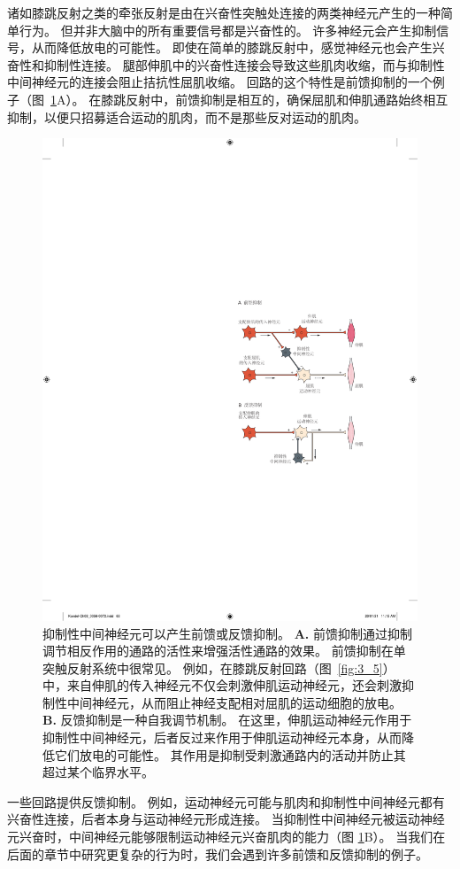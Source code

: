 诸如膝跳反射之类的牵张反射是由在兴奋性突触处连接的两类神经元产生的一种简单行为。 
但并非大脑中的所有重要信号都是兴奋性的。 
许多神经元会产生抑制信号，从而降低放电的可能性。 
即使在简单的膝跳反射中，感觉神经元也会产生兴奋性和抑制性连接。 
腿部伸肌中的兴奋性连接会导致这些肌肉收缩，而与抑制性中间神经元的连接会阻止拮抗性屈肌收缩。 
回路的这个特性是前馈抑制的一个例子（图~\ref{fig:3_7}A）。 
在膝跳反射中，前馈抑制是相互的，确保屈肌和伸肌通路始终相互抑制，以便只招募适合运动的肌肉，而不是那些反对运动的肌肉。


\begin{figure}[htbp]
	\centering
	\includegraphics[width=0.6\linewidth]{chap03/fig_3_7}
	\caption{抑制性中间神经元可以产生前馈或反馈抑制。
		\textbf{A.} 前馈抑制通过抑制调节相反作用的通路的活性来增强活性通路的效果。
		前馈抑制在单突触反射系统中很常见。 
		例如，在膝跳反射回路（图~\ref{fig:3_5}）中，来自伸肌的传入神经元不仅会刺激伸肌运动神经元，还会刺激抑制性中间神经元，从而阻止神经支配相对屈肌的运动细胞的放电。 
		\textbf{B.} 反馈抑制是一种自我调节机制。
		在这里，伸肌运动神经元作用于抑制性中间神经元，后者反过来作用于伸肌运动神经元本身，从而降低它们放电的可能性。
		其作用是抑制受刺激通路内的活动并防止其超过某个临界水平。}
	\label{fig:3_7}
\end{figure}


一些回路提供反馈抑制。 
例如，运动神经元可能与肌肉和抑制性中间神经元都有兴奋性连接，后者本身与运动神经元形成连接。 
当抑制性中间神经元被运动神经元兴奋时，中间神经元能够限制运动神经元兴奋肌肉的能力（图 \ref{fig:3_7}B）。 
当我们在后面的章节中研究更复杂的行为时，我们会遇到许多前馈和反馈抑制的例子。


